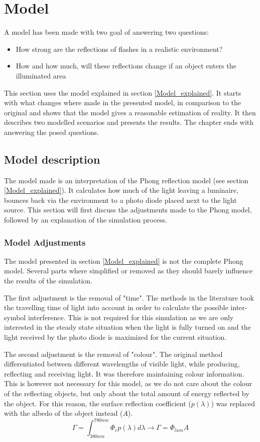 \chapter{Model}
\label{Model}

A model has been made with two goal of answering two questions:
\begin{itemize}[itemsep=-1ex,topsep=0pt]
	\item How strong are the reflections of flashes in a realistic environment?
	\item How and how much, will these reflections change if an object enters the illuminated area
\end{itemize}
This section uses the model explained in section \ref{Model_explained}. It starts with what changes where made in the presented model, in comparison to the original \cite{Advances_In_Optical_Communication} and shows that the model gives a reasonable estimation of reality. It then describes two modelled scenarios and presents the results. The chapter ends with answering the posed questions.

\section{Model description}
The model made is an interpretation of the Phong reflection model (see section \ref{Model_explained}). It calculates how much of the light leaving a luminaire, bounces back via the environment to a photo diode placed next to the light source. This section will first discuss the adjustments made to the Phong model, followed by an explanation of the simulation process.

\subsection{Model Adjustments}
The model presented in section \ref{Model_explained} is not the complete Phong model. Several parts where simplified or removed as they should barely influence the results of the simulation.

The first adjustment is the removal of "time". The methods in the literature took the travelling time of light into account in order to calculate the possible inter-symbol interference. This is not required for this simulation as we are only interested in the steady state situation when the light is fully turned on and the light received by the photo diode is maximized for the current situation.

The second adjustment is the removal of "colour". The original method differentiated between different wavelengths of visible light, while producing, reflecting and receiving light. It was therefore maintaining colour information. This is however not necessary for this model, as we do not care about the colour of the reflecting objects, but only about the total amount of energy reflected by the object. For this reason, the surface reflection coefficient ($p(\lambda)$) was replaced with the albedo of the object instead ($A$).
\begin{equation}
\label{Model_simp_2}
\Gamma = \int_{380nm}^{780nm} \Phi_e p(\lambda) d\lambda \to \Gamma = \Phi_{lum} A
\end{equation}

